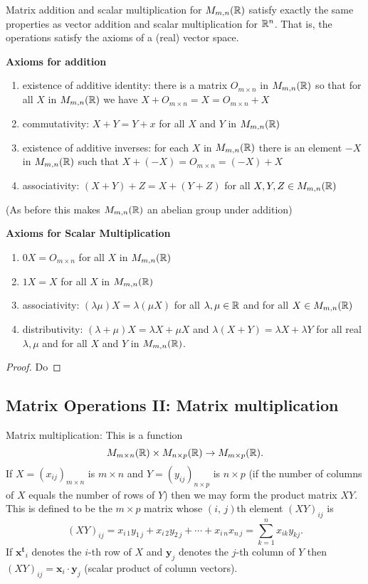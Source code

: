 \documentclass[10pt, a4paper]{article}
\newcommand{\mbf}[1]{\mathbf{#1}}
\begin{document}
\begin{proposition}
    Matrix addition and scalar multiplication for $M_{m, n}(\mathbb{R})$ satisfy exactly the same properties as vector addition and scalar multiplication for $\mathbb{R} ^ n$. That is, the operations satisfy the axioms of a (real) vector space.

    \textbf{Axioms for addition}
    \begin{enumerate}[label = (\roman*)]
        \item existence of additive identity: there is a matrix $O_{m \times n}$ in $M_{m, n}(\mathbb{R})$ so that for all $X$ in $M_{m, n}(\mathbb{R})$ we have $X + O_{m \times n} = X = O_{m \times n} + X$ 
        \item commutativity: $X + Y = Y + x$ for all $X$ and $Y$ in $M_{m, n}(\mathbb{R})$
        \item existence of additive inverses: for each $X$ in $M_{m, n}(\mathbb{R})$ there is an element $-X$ in $M_{m, n}(\mathbb{R})$ such that $X + (-X) = O_{m \times n} = (-X) + X$
        \item associativity: $(X + Y) + Z = X + (Y + Z)$ for all $X, Y, Z \in M_{m, n}(\mathbb{R})$
    \end{enumerate}
    (As before this makes $M_{m, n}(\mathbb{R})$ an abelian group under addition)

    \textbf{Axioms for Scalar Multiplication}
    \begin{enumerate}[label = (\roman*)]
        \item $0X = O_{m \times n}$ for all $X$ in $M_{m, n}(\mathbb{R})$
        \item $1X = X$ for all $X$ in $M_{m, n}(\mathbb{R})$
        \item associativity: $(\lambda\mu)X = \lambda(\mu X)$ for all $\lambda, \mu \in \mathbb{R}$ and for all $X \in M_{m, n}(\mathbb{R})$
        \item distributivity: $(\lambda + \mu)X = \lambda X + \mu X$ and $\lambda (X + Y) = \lambda X + \lambda Y$ for all real $\lambda, \mu$ and for all $X$ and $Y$ in $M_{m, n}(\mathbb{R})$.
    \end{enumerate}
    \begin{proof}
        Do
    \end{proof}
\end{proposition}

\subsection{Matrix Operations II: Matrix multiplication}
Matrix multiplication: This is a function
\[
M_{m \times n}(\mathbb{R}) \times M_{n \times p}(\mathbb{R}) \rightarrow M_{m \times p}(\mathbb{R}).
\]
If $X = (x_{ij})_{m \times n}$ is $m \times n$ and $Y = (y_{ij})_{n \times p}$ is $n \times p$ (if the number of columns of $X$ equals the number of rows of $Y$) then we may form the product matrix $XY$. This is defined to be the $m \times p$ matrix whose $(i,\,j)$th element $(XY)_{ij}$ is
\[
(XY)_{ij} = x_{i\,1}y_{1\,j} + x_{i\,2}y_{2\,j} + \dotsi + x_{i\,n}x_{n\,j} = \sum_{k = 1}^{n}{x_{ik}y_{kj}}.
\]
If $\mbf{x ^ t}_{i}$ denotes the $i$-th row of $X$ and $\mbf{y}_j$ denotes the $j$-th column of $Y$ then $(XY)_{ij} = \mbf{x}_i \cdot \mbf{y}_j$ (scalar product of column vectors).
\end{document}
